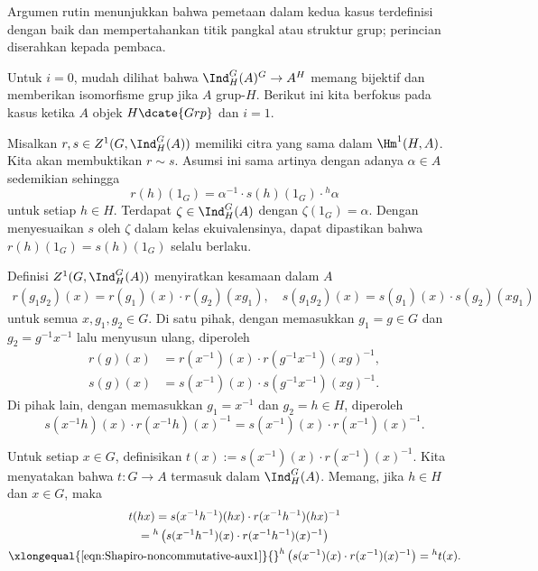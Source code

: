 \begin{bukti}
	Argumen rutin menunjukkan bahwa pemetaan dalam kedua kasus terdefinisi
	dengan baik dan mempertahankan titik pangkal atau struktur grup; perincian
	diserahkan kepada pembaca.
	
	Untuk $i=0$, mudah dilihat bahwa
	$\Ind^G_H(A)^G\to A^H$ memang bijektif dan memberikan isomorfisme grup
	jika $A$ grup-$H$. Berikut ini kita berfokus pada kasus ketika $A$ objek
	$H\dcate{Grp}$ dan $i=1$.
	
	Misalkan $r,s\in Z^1(G,\Ind^G_H(A))$ memiliki citra yang sama dalam
	$\Hm^1(H,A)$. Kita akan membuktikan $r\sim s$. Asumsi ini sama artinya
	dengan adanya $\alpha\in A$ sedemikian sehingga
	\[ r(h)(1_G) = \alpha^{-1} \cdot s(h)(1_G) \cdot {}^h \alpha \]
	untuk setiap $h\in H$. Terdapat $\zeta\in\Ind^G_H(A)$ dengan
	$\zeta(1_G)=\alpha$. Dengan menyesuaikan $s$ oleh $\zeta$ dalam kelas
	ekuivalensinya, dapat dipastikan bahwa $r(h)(1_G)=s(h)(1_G)$ selalu berlaku.
	
	Definisi $Z^1(G,\Ind^G_H(A))$ menyiratkan kesamaan dalam $A$
	\begin{gather*}
		r(g_1 g_2)(x) =r(g_1)(x) \cdot r(g_2)(xg_1), \quad s(g_1 g_2)(x) = s(g_1)(x) \cdot s(g_2)(xg_1)
	\end{gather*}
	untuk semua $x,g_1,g_2\in G$. Di satu pihak, dengan memasukkan
	$g_1=g\in G$ dan $g_2=g^{-1}x^{-1}$ lalu menyusun ulang, diperoleh
	\begin{equation}\label{eqn:Shapiro-noncommutative-aux0}
		\begin{aligned}
			r(g)(x) & = r(x^{-1})(x) \cdot r(g^{-1} x^{-1})(xg)^{-1}, \\
			s(g)(x) & = s(x^{-1})(x) \cdot s(g^{-1} x^{-1})(xg)^{-1}.
		\end{aligned}
	\end{equation}
	Di pihak lain, dengan memasukkan $g_1=x^{-1}$ dan $g_2=h\in H$, diperoleh
	\begin{equation}\label{eqn:Shapiro-noncommutative-aux1}
		s(x^{-1} h)(x) \cdot r(x^{-1} h)(x)^{-1} = s(x^{-1})(x) \cdot r(x^{-1})(x)^{-1}.
	\end{equation}
	
	Untuk setiap $x\in G$, definisikan
	$t(x):=s(x^{-1})(x)\cdot r(x^{-1})(x)^{-1}$. Kita menyatakan bahwa
	$t:G\to A$ termasuk dalam $\Ind^G_H(A)$. Memang, jika $h\in H$ dan
	$x\in G$, maka
	\begin{multline*}
		t(hx) = s(x^{-1} h^{-1})(hx) \cdot r(x^{-1} h^{-1})(hx)^{-1} \\
		= {}^h \left( s(x^{-1}h^{-1})(x) \cdot r(x^{-1} h^{-1})(x)^{-1} \right) \\
		\xlongequal{\text{\eqref{eqn:Shapiro-noncommutative-aux1}}} {}^h \left( s(x^{-1})(x) \cdot r(x^{-1})(x)^{-1} \right) = {}^h t(x).
	\end{multline*}


\end{bukti}
